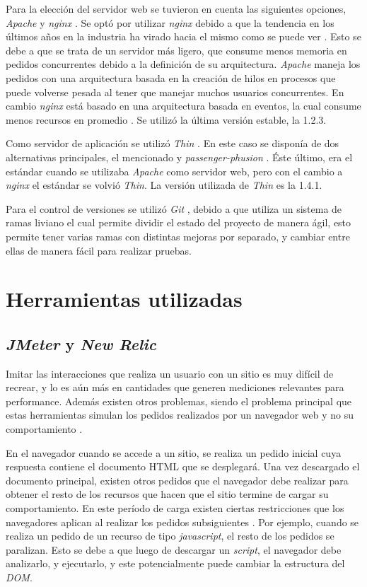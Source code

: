 Para la elección del servidor web se tuvieron en cuenta las siguientes opciones, \emph{Apache} \cite{apache} y \emph{nginx} \cite{nginx}. Se optó por utilizar \emph{nginx} debido a que la tendencia en los 
últimos años en la industria ha virado hacia el mismo como se puede ver \cite{nginx_vs_apache}. Esto se debe a que se trata de un servidor más ligero, que consume menos memoria 
en pedidos concurrentes debido a la definición de su arquitectura. \emph{Apache} maneja los pedidos con una arquitectura basada en la creación de hilos en procesos que puede 
volverse pesada al tener que manejar muchos usuarios concurrentes. En cambio \emph{nginx} está basado en una arquitectura basada en eventos, la cual consume menos recursos 
en promedio \cite{nginx_perf}. Se utilizó la última versión estable, la 1.2.3.

Como servidor de aplicación se utilizó \emph{Thin} \cite{thin}. En este caso se disponía de dos alternativas principales, el mencionado y \emph{passenger-phusion} \cite{phusion_passenger}. Éste último, era
el estándar cuando se utilizaba \emph{Apache} como servidor web, pero con el cambio a \emph{nginx} el estándar se volvió \emph{Thin}. La versión utilizada de \emph{Thin} es la
1.4.1.

Para el control de versiones se utilizó \emph{Git} \cite{git}, debido a que utiliza un sistema de ramas liviano el cual permite dividir el estado del proyecto de manera ágil, esto permite
tener varias ramas con distintas mejoras por separado, y cambiar entre ellas de manera fácil para realizar pruebas.

\section{Herramientas utilizadas}
\label{cap7:herramientas}
\subsection{\emph{JMeter} y \emph{New Relic}}

Imitar las interacciones que realiza un usuario con un sitio es muy difícil de recrear, y lo es aún más en cantidades que generen mediciones relevantes para performance.
Además existen otros problemas, siendo el problema principal que estas herramientas simulan los pedidos realizados por un navegador web y no su comportamiento \cite{jmeter}.

En el navegador cuando se accede a un sitio, se realiza un pedido inicial cuya respuesta contiene el documento HTML que se desplegará. Una vez descargado el documento principal, 
existen otros pedidos que el navegador debe realizar para obtener el resto de los recursos que hacen que el sitio termine de cargar su comportamiento. En este período de carga 
existen ciertas restricciones que los navegadores aplican al realizar los pedidos subsiguientes \cite{souders2007high}. Por ejemplo, cuando se realiza un pedido de un recurso de tipo 
\emph{javascript}, el resto de los pedidos se paralizan. Esto se debe a que luego de descargar un \emph{script}, el navegador debe analizarlo, y ejecutarlo, y este potencialmente 
puede cambiar la estructura del \emph{DOM}.

